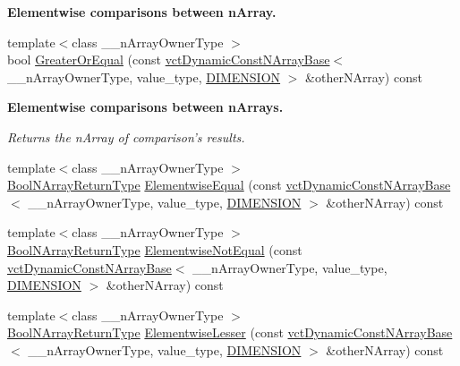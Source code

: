 \begin{Indent}{\bf Elementwise comparisons between n\-Array.}
\begin{DoxyCompactItemize}
\item 
{\footnotesize template$<$class \-\_\-\-\_\-n\-Array\-Owner\-Type $>$ }\\bool \hyperlink{classvct_dynamic_const_n_array_base_ab7a14c756ce67c46751370b35bf553a7}{Greater\-Or\-Equal} (const \hyperlink{classvct_dynamic_const_n_array_base}{vct\-Dynamic\-Const\-N\-Array\-Base}$<$ \-\_\-\-\_\-n\-Array\-Owner\-Type, value\-\_\-type, \hyperlink{classvct_dynamic_const_n_array_base_a815ac316ebc1bb2ab1969d307549826faf759c9ab831ff929b89af4ea2865a378}{D\-I\-M\-E\-N\-S\-I\-O\-N} $>$ \&other\-N\-Array) const 
\end{DoxyCompactItemize}
\end{Indent}
\begin{Indent}{\bf Elementwise comparisons between n\-Arrays.}\par
{\em Returns the n\-Array of comparison's results. }\begin{DoxyCompactItemize}
\item 
{\footnotesize template$<$class \-\_\-\-\_\-n\-Array\-Owner\-Type $>$ }\\\hyperlink{classvct_dynamic_const_n_array_base_a983f2b7edd51a896d447383b5a5af289}{Bool\-N\-Array\-Return\-Type} \hyperlink{classvct_dynamic_const_n_array_base_aaf132638161f6ca6d065e07e56a8e282}{Elementwise\-Equal} (const \hyperlink{classvct_dynamic_const_n_array_base}{vct\-Dynamic\-Const\-N\-Array\-Base}$<$ \-\_\-\-\_\-n\-Array\-Owner\-Type, value\-\_\-type, \hyperlink{classvct_dynamic_const_n_array_base_a815ac316ebc1bb2ab1969d307549826faf759c9ab831ff929b89af4ea2865a378}{D\-I\-M\-E\-N\-S\-I\-O\-N} $>$ \&other\-N\-Array) const 
\item 
{\footnotesize template$<$class \-\_\-\-\_\-n\-Array\-Owner\-Type $>$ }\\\hyperlink{classvct_dynamic_const_n_array_base_a983f2b7edd51a896d447383b5a5af289}{Bool\-N\-Array\-Return\-Type} \hyperlink{classvct_dynamic_const_n_array_base_ab27e10a24a8c6a5b8480e660416aa93e}{Elementwise\-Not\-Equal} (const \hyperlink{classvct_dynamic_const_n_array_base}{vct\-Dynamic\-Const\-N\-Array\-Base}$<$ \-\_\-\-\_\-n\-Array\-Owner\-Type, value\-\_\-type, \hyperlink{classvct_dynamic_const_n_array_base_a815ac316ebc1bb2ab1969d307549826faf759c9ab831ff929b89af4ea2865a378}{D\-I\-M\-E\-N\-S\-I\-O\-N} $>$ \&other\-N\-Array) const 
\item 
{\footnotesize template$<$class \-\_\-\-\_\-n\-Array\-Owner\-Type $>$ }\\\hyperlink{classvct_dynamic_const_n_array_base_a983f2b7edd51a896d447383b5a5af289}{Bool\-N\-Array\-Return\-Type} \hyperlink{classvct_dynamic_const_n_array_base_a4e97a98d89c11e2a5a91bdfaf1de2ac6}{Elementwise\-Lesser} (const \hyperlink{classvct_dynamic_const_n_array_base}{vct\-Dynamic\-Const\-N\-Array\-Base}$<$ \-\_\-\-\_\-n\-Array\-Owner\-Type, value\-\_\-type, \hyperlink{classvct_dynamic_const_n_array_base_a815ac316ebc1bb2ab1969d307549826faf759c9ab831ff929b89af4ea2865a378}{D\-I\-M\-E\-N\-S\-I\-O\-N} $>$ \&other\-N\-Array) const 

\end{DoxyCompactItemize}
\end{Indent}
